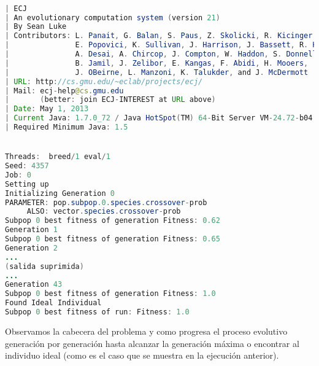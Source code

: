 \begin{lstlisting}[language=Java]

| ECJ
| An evolutionary computation system (version 21)
| By Sean Luke
| Contributors: L. Panait, G. Balan, S. Paus, Z. Skolicki, R. Kicinger,
|               E. Popovici, K. Sullivan, J. Harrison, J. Bassett, R. Hubley,
|               A. Desai, A. Chircop, J. Compton, W. Haddon, S. Donnelly,
|               B. Jamil, J. Zelibor, E. Kangas, F. Abidi, H. Mooers,
|               J. OBeirne, L. Manzoni, K. Talukder, and J. McDermott
| URL: http://cs.gmu.edu/~eclab/projects/ecj/
| Mail: ecj-help@cs.gmu.edu
|       (better: join ECJ-INTEREST at URL above)
| Date: May 1, 2013
| Current Java: 1.7.0_72 / Java HotSpot(TM) 64-Bit Server VM-24.72-b04
| Required Minimum Java: 1.5


Threads:  breed/1 eval/1
Seed: 4357 
Job: 0
Setting up
Initializing Generation 0
PARAMETER: pop.subpop.0.species.crossover-prob
     ALSO: vector.species.crossover-prob
Subpop 0 best fitness of generation Fitness: 0.62
Generation 1
Subpop 0 best fitness of generation Fitness: 0.65
Generation 2
...
(salida suprimida)
...
Generation 43
Subpop 0 best fitness of generation Fitness: 1.0
Found Ideal Individual
Subpop 0 best fitness of run: Fitness: 1.0
\end{lstlisting}

Observamos la cabecera del problema y como progresa el proceso evolutivo generaci\'on por generaci\'on hasta alcanzar la generaci\'on m\'axima o encontrar al individuo ideal (como es el caso que se muestra en la ejecuci\'on anterior). 









